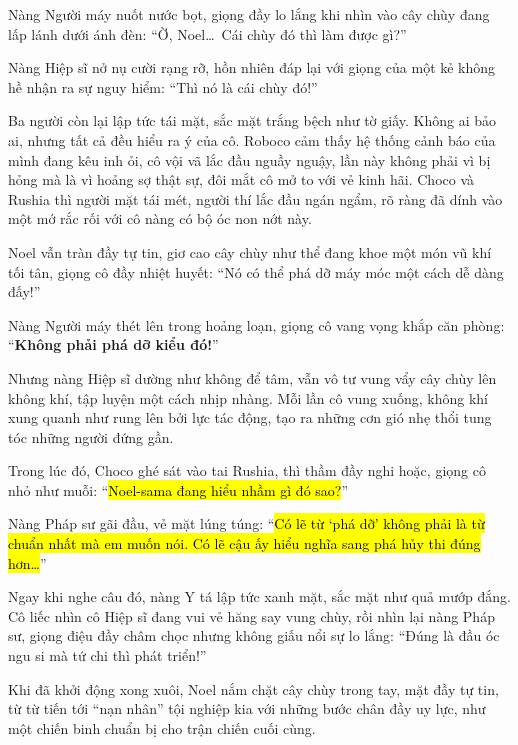 \documentclass[../main.tex]{subfiles}
\begin{document}

Nàng Người máy nuốt nước bọt, giọng đầy lo lắng khi nhìn vào cây chùy đang lấp lánh dưới ánh đèn: ``Ờ, Noel\dots\ Cái chùy đó thì làm được gì?''

Nàng Hiệp sĩ nở nụ cười rạng rỡ, hồn nhiên đáp lại với giọng của một kẻ không hề nhận ra sự nguy hiểm: ``Thì nó là cái chùy đó!''

Ba người còn lại lập tức tái mặt, sắc mặt trắng bệch như tờ giấy. Không ai bảo ai, nhưng tất cả đều hiểu ra ý của cô. Roboco cảm thấy hệ thống cảnh báo của mình đang kêu inh ỏi, cô vội vã lắc đầu nguầy nguậy, lần này không phải vì bị hỏng mà là vì hoảng sợ thật sự, đôi mắt cô mở to với vẻ kinh hãi. Choco và Rushia thì người mặt tái mét, người thí lắc đầu ngán ngẩm, rõ ràng đã dính vào một mớ rắc rối với cô nàng có bộ óc non nớt này.


Noel vẫn tràn đầy tự tin, giơ cao cây chùy như thể đang khoe một món vũ khí tối tân, giọng cô đầy nhiệt huyết: ``Nó có thể phá dỡ máy móc một cách dễ dàng đấy!''


Nàng Người máy thét lên trong hoảng loạn, giọng cô vang vọng khắp căn phòng: ``\textbf{Không phải phá dỡ kiểu đó!}''

Nhưng nàng Hiệp sĩ dường như không để tâm, vẫn vô tư vung vẩy cây chùy lên không khí, tập luyện một cách nhịp nhàng. Mỗi lần cô vung xuống, không khí xung quanh như rung lên bởi lực tác động, tạo ra những cơn gió nhẹ thổi tung tóc những người đứng gần.

Trong lúc đó, Choco ghé sát vào tai Rushia, thì thầm đầy nghi hoặc, giọng cô nhỏ như muỗi: ``\hl{Noel-sama đang hiểu nhầm gì đó sao?}''

Nàng Pháp sư gãi đầu, vẻ mặt lúng túng: ``\hl{Có lẽ từ `phá dỡ' không phải là từ chuẩn nhất mà em muốn nói. Có lẽ cậu ấy hiểu nghĩa sang phá hủy thi đúng hơn\dots}''

Ngay khi nghe câu đó, nàng Y tá lập tức xanh mặt, sắc mặt như quả mướp đắng. Cô liếc nhìn cô Hiệp sĩ đang vui vẻ hăng say vung chùy, rồi nhìn lại nàng Pháp sư, giọng điệu đầy châm chọc nhưng không giấu nổi sự lo lắng: ``Đúng là đầu óc ngu si mà tứ chi thì phát triển!''

Khi đã khởi động xong xuôi, Noel nắm chặt cây chùy trong tay, mặt đầy tự tin, từ từ tiến tới ``nạn nhân'' tội nghiệp kia với những bước chân đầy uy lực, như một chiến binh chuẩn bị cho trận chiến cuối cùng.
\end{document}
